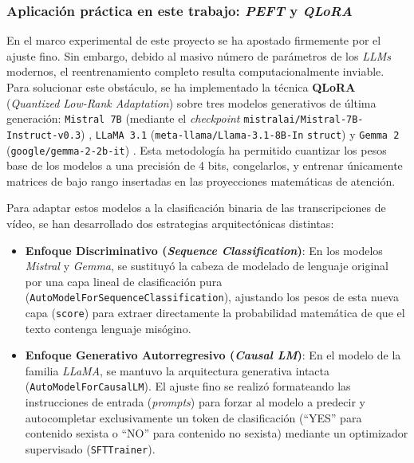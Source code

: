 \subsubsection*{Aplicación práctica en este trabajo: \textit{PEFT} y \textit{QLoRA}}
\label{subsubsec:ModelosLLMs}
En el marco experimental de este proyecto se ha apostado firmemente por el ajuste fino. Sin embargo, debido al masivo número de parámetros de los \textit{LLMs} modernos, el reentrenamiento completo resulta computacionalmente inviable. Para solucionar este obstáculo, se ha implementado la técnica \textbf{QLoRA} (\textit{Quantized Low-Rank Adaptation}) \cite{dettmers2023qlora} sobre tres modelos generativos de última generación: \texttt{Mistral 7B} (mediante el \textit{checkpoint} \texttt{mistralai/Mistral-7B-Instruct-v0.3}) \cite{jiang2023mistral}, \texttt{LLaMA 3.1} (\texttt{meta-llama/Llama-3.1-8B-In} \texttt{struct}) \cite{dubey2024llama3} y \texttt{Gemma 2} (\texttt{google/gemma-2-2b-it}) \cite{team2024gemma}. Esta metodología ha permitido cuantizar los pesos base de los modelos a una precisión de 4 bits, congelarlos, y entrenar únicamente matrices de bajo rango insertadas en las proyecciones matemáticas de atención.

Para adaptar estos modelos a la clasificación binaria de las transcripciones de vídeo, se han desarrollado dos estrategias arquitectónicas distintas:
\begin{itemize}
\item \textbf{Enfoque Discriminativo (\textit{Sequence Classification})}: En los modelos \textit{Mistral} y \textit{Gemma}, se sustituyó la cabeza de modelado de lenguaje original por una capa lineal de clasificación pura (\texttt{AutoModelForSequenceClassification}), ajustando los pesos de esta nueva capa (\texttt{score}) para extraer directamente la probabilidad matemática de que el texto contenga lenguaje misógino.
\item \textbf{Enfoque Generativo Autorregresivo (\textit{Causal LM})}: En el modelo de la familia \textit{LLaMA}, se mantuvo la arquitectura generativa intacta (\texttt{AutoModelForCausalLM}). El ajuste fino se realizó formateando las instrucciones de entrada (\textit{prompts}) para forzar al modelo a predecir y autocompletar exclusivamente un token de clasificación (``YES'' para contenido sexista o ``NO'' para contenido no sexista) mediante un optimizador supervisado (\texttt{SFTTrainer}).
\end{itemize}

